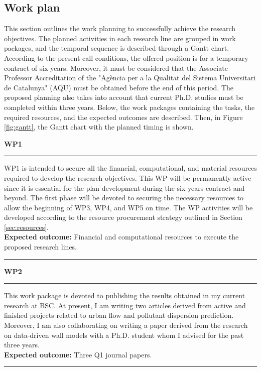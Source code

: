 \documentclass{article}
\begin{document}
\subsection{Work plan}

This section outlines the work planning to successfully achieve the research objectives. The planned activities in each research line are grouped in work packages, and the temporal sequence is described through a Gantt chart. According to the present call conditions, the offered position is for a temporary contract of six years. Moreover, it must be considered that the Associate Professor Accreditation of the "Agència per a la Qualitat del Sistema Universitari de Catalunya" (AQU) must be obtained before the end of this period. The proposed planning also takes into account that current Ph.D. studies must be completed within three years. Below, the work packages containing the tasks, the required resources, and the expected outcomes are described. Then, in Figure \ref{fig:gantt}, the Gantt chart with the planned timing is shown.

\vspace{0.5cm}

{\bf WP1}
\vspace{4pt}
\hrule
WP1 is intended to secure all the financial, computational, and material resources required to develop the research objectives. This WP will be permanently active since it is essential for the plan development during the six years contract and beyond. The first phase will be devoted to securing the necessary resources to allow the beginning of WP3, WP4, and WP5 on time. The WP activities will be developed according to the resource
procurement strategy outlined in Section \ref{sec:resources}.  \\         {\bf Expected outcome:} Financial and computational resources to execute the proposed research lines.
 \vspace{4pt}
\hrule

\vspace{0.5cm}

{ \bf WP2 }
\vspace{4pt}
\hrule
This work package is devoted to publishing the results obtained in my current research at BSC. At present, I am writing two articles derived from active and finished projects related to urban flow and pollutant dispersion prediction. Moreover, I am also collaborating on writing a paper derived from the research on data-driven wall models with a Ph.D. student whom I advised for the past three years. \\
{\bf Expected outcome:} Three Q1 journal papers.
\vspace{4pt}
\hrule
\end{document}
